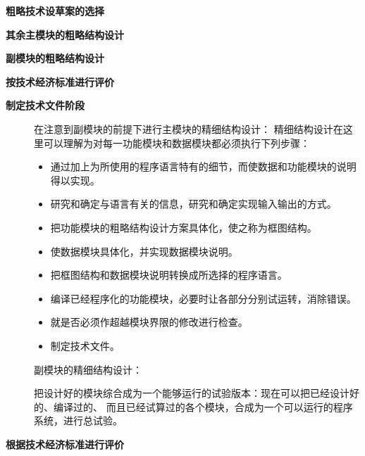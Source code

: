 \documentclass[letterpaper,10pt,english]{sphinxmanual}
\begin{document}
\textbf{粗略技术设草案的选择}

\textbf{其余主模块的粗略结构设计}

\textbf{副模块的粗略结构设计}

\textbf{按技术经济标准进行评价}
\begin{description}
\item[{\textbf{制定技术文件阶段}}] \leavevmode
在注意到副模块的前提下进行主模块的精细结构设计：
精细结构设计在这里可以理解为对每一功能模块和数据模块都必须执行下列步骤：
\begin{itemize}
\item {} 
通过加上为所使用的程序语言特有的细节，而使数据和功能模块的说明得以实现。

\item {} 
研究和确定与语言有关的信息，研究和确定实现输入输出的方式。

\item {} 
把功能模块的粗略结构设计方案具体化，使之称为框图结构。

\item {} 
使数据模块具体化，并实现数据模块说明。

\item {} 
把框图结构和数据模块说明转换成所选择的程序语言。

\item {} 
编译已经程序化的功能模块，必要时让各部分分别试运转，消除错误。

\item {} 
就是否必须作超越模块界限的修改进行检查。

\item {} 
制定技术文件。

\end{itemize}

副模块的精细结构设计：

把设计好的模块综合成为一个能够运行的试验版本：现在可以把已经设计好的、编译过的、
而且已经试算过的各个模块，合成为一个可以运行的程序系统，进行总试验。

\end{description}

\textbf{根据技术经济标准进行评价}
\end{document}

